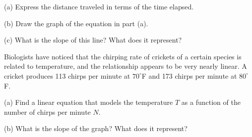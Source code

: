 \documentclass{sebase}
\begin{document}
\begin{multicols}{2}
\begin{ExerciseList}
\begin{ExerciseList}
\item[(a)] Express the distance traveled in terms of the time elapsed.

%

\item[(b)] Draw the graph of the equation in part (a).

%

\item[(c)] What is the slope of this line? What does it represent?

%
\end{ExerciseList}

\item[{\hfill \protect\fbox{\hspace{-2pt}15.\hspace{-2pt}}}] Biologists have
noticed that the chirping rate of crickets of a certain species is related
to temperature, and the relationship appears to be very nearly linear. A
cricket produces 113 chirps per minute at $70^{\circ }$F and 173 chirps per
minute at $80^{\circ }$F.\vspace{-2pt}

\begin{ExerciseList}
\item[(a)] Find a linear equation that models the temperature $T$ as a
function of the number of chirps per minute $N$.

%

\item[(b)] What is the slope of the graph? What does it represent?

%


\end{ExerciseList}
\end{ExerciseList}
\end{multicols}
\end{document}
